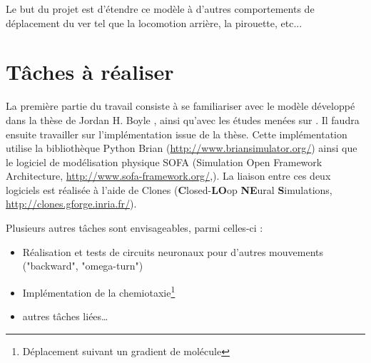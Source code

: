 Le but du projet est d'étendre ce modèle à d'autres comportements de déplacement du ver tel que la locomotion arrière, la pirouette, etc...


\section{Tâches à réaliser} %
\label{sec:Tâches à réaliser}

La première partie du travail consiste à se familiariser avec le modèle développé dans la thèse de Jordan
H. Boyle \cite{Boyle2009}, ainsi qu'avec les études menées sur \celeg{}. Il faudra ensuite travailler sur
l'implémentation issue de la thèse. Cette implémentation utilise la bibliothèque Python Brian
(\url{http://www.briansimulator.org/}) ainsi que le logiciel de modélisation physique SOFA
(Simulation Open Framework Architecture, \url{http://www.sofa-framework.org/},\cite{Allard2007}). La liaison entre ces
deux logiciels est réalisée à l'aide de Clones (\textbf{C}losed-\textbf{LO}op \textbf{NE}ural \textbf{S}imulations,\\
\url{http://clones.gforge.inria.fr/}).

Plusieurs autres tâches sont envisageables, parmi celles-ci :
\begin{itemize}
   \item Réalisation et tests de circuits neuronaux pour d'autres mouvements ("backward", "omega-turn")
   \item Implémentation de la chemiotaxie\footnote{Déplacement suivant un gradient de molécule}
   \item autres tâches liées\dots
\end{itemize}




